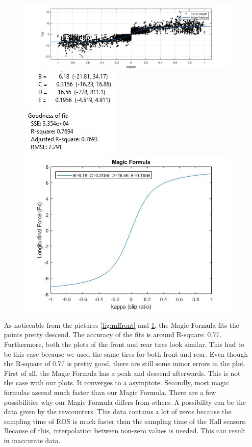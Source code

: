 \begin{figure}
	\centering
		\includegraphics[scale=0.2]{figure/MagicFormulaRearBags}
		\includegraphics[scale=0.5]{figure/MagicFormulaRearBagsFitnumbers}
		\includegraphics[scale=0.2]{figure/MagicFormulaRearBagsPic}
		\label{fig:mfrear}
\end{figure}
As noticeable from the pictures \ref{fig:mffront} and \ref{fig:mfrear}, the Magic Formula fits the points pretty descend. The accuracy of the fits is around R-square: 0.77. Furthermore, both the plots of the front and rear tires look similar. This had to be this case because we used the same tires for both front and rear. 
Even though the R-square of 0.77 is pretty good, there are still some minor errors in the plot. First of all, the Magic Formula has a peak and descend afterwards. This is not the case with our plots. It converges to a asymptote. Secondly, most magic formulas ascend much faster than our Magic Formula.
	There are a few possibilities why our Magic Formula differs from others. A possibility can be the data given by the revcounters. This data contains a lot of zeros because the sampling time of ROS is much faster than the sampling time of the Hall sensors. Because of this, interpolation between non-zero values is needed. This can result in inaccurate data. 

